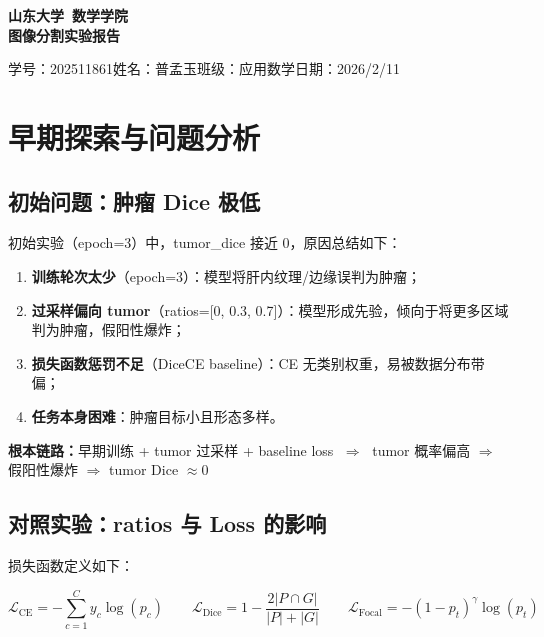 \documentclass{article}
\begin{document}
	
	\songti{}
	
	\begin{center}
		\heiti{}\textbf{山东大学\ 数学学院} \\[4pt]
		\heiti{}\textbf{图像分割实验报告}
	\end{center}
	
	\vspace{0.8cm}
	\noindent 学号：202511861\quad 姓名：普孟玉\quad 班级：应用数学\quad 日期：2026/2/11
	\vspace{0.5cm}
	
	\section{早期探索与问题分析}
	
	\subsection{初始问题：肿瘤 Dice 极低}
	
	初始实验（epoch=3）中，tumor\_dice 接近 0，原因总结如下：
	
	\begin{enumerate}
		\item \textbf{训练轮次太少}（epoch=3）：模型将肝内纹理/边缘误判为肿瘤；
		\item \textbf{过采样偏向 tumor}（ratios=[0, 0.3, 0.7]）：模型形成先验，倾向于将更多区域判为肿瘤，假阳性爆炸；
		\item \textbf{损失函数惩罚不足}（DiceCE baseline）：CE 无类别权重，易被数据分布带偏；
		\item \textbf{任务本身困难}：肿瘤目标小且形态多样。
	\end{enumerate}
	
	\noindent\textbf{根本链路：}早期训练 + tumor 过采样 + baseline loss
	$\;\Rightarrow\;$ tumor 概率偏高 $\Rightarrow$ 假阳性爆炸 $\Rightarrow$ tumor Dice $\approx 0$
	
	\subsection{对照实验：ratios 与 Loss 的影响}
	
	损失函数定义如下：
	
	\begin{equation}
		\mathcal{L}_{\text{CE}} = -\sum_{c=1}^{C} y_c \log(p_c)
		\qquad
		\mathcal{L}_{\text{Dice}} = 1 - \frac{2|P \cap G|}{|P|+|G|}
		\qquad
		\mathcal{L}_{\text{Focal}} = -(1-p_t)^{\gamma}\log(p_t)
	\end{equation}
	
\end{document}
